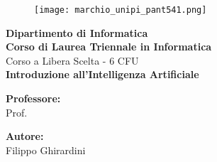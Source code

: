 \begin{titlepage} %
	\begin{figure}[t] %
		\centering\texttt{[image: marchio\_unipi\_pant541.png]}
	\end{figure}
	\vspace{20mm}
	
	\begin{Large}
		\begin{center}
			\textbf{Dipartimento di Informatica\\ Corso di Laurea Triennale in Informatica\\}
			\vspace{20mm}
			{\LARGE{Corso a Libera Scelta - 6 CFU}}\\
			\vspace{10mm}
			{\huge{\bf Introduzione all'Intelligenza Artificiale}}\\
		\end{center}
	\end{Large}
	
	
	\vspace{36mm}
	\begin{minipage}[t]{0.47\textwidth}
		{\large{\bf Professore:}\\ \large{Prof. }}
	\end{minipage}
	\hfill
	\begin{minipage}[t]{0.47\textwidth}\raggedleft
		{\large{\bf Autore:}\\ \large{Filippo Ghirardini}}
	\end{minipage}
	
	\vspace{25mm}
	
	\hrulefill
	
	\vspace{5mm}
	
	
\end{titlepage}